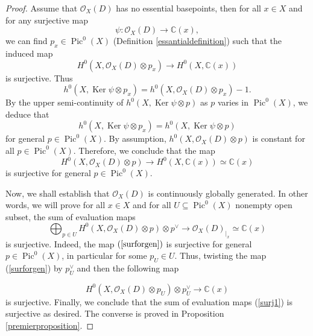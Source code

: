 \documentclass[sn-mathphys-num]{sn-jnl}%
\newcommand{\C}{\mathbb{C}}
\theoremstyle{definition}
\numberwithin{equation}{section}
\begin{document}
\begin{proof}
    Assume that $\mathcal{O}_{X}(D)$ has no essential basepoints, then for all $x \in X$ and for any surjective map 
    \[\psi: \mathcal{O}_{X}(D) \to \C(x),\] we can find $p_{x} \in \operatorname{Pic}^{0}(X)$ (Definition \ref{essantialdefinition}) such that the induced map \[H^{0}(X, \mathcal{O}_{X}(D) \otimes p_{x} ) \to H^{0}(X, \C(x))\] 
    is surjective. Thus $$h^{0}(X, \operatorname{Ker}\psi \otimes p_x) = h^{0}(X, \mathcal{O}_{X}(D) \otimes p_{x} ) -1.$$  
    By the upper semi-continuity of $h^{0}(X, \operatorname{Ker}\psi \otimes p)$ as $p$ varies in $\operatorname{Pic}^{0}(X)$, we deduce that 
    \[
    h^{0}(X, \operatorname{Ker}\psi \otimes p_x) = h^{0}(X, \operatorname{Ker}\psi \otimes p)
    \]
    for general $p \in \operatorname{Pic}^{0}(X)$. By assumption, $h^{0}(X, \mathcal{O}_{X}(D) \otimes p)$ is constant for all $p \in \operatorname{Pic}^{0}(X)$. Therefore,  we conclude that the map 
   \begin{equation}\label{surforgen}
       H^{0}(X, \mathcal{O}_{X}(D) \otimes p) \to H^{0}(X, \C(x)) \simeq \C(x)
       \end{equation}
   is surjective for general $p \in \operatorname{Pic}^{0}(X)$. 
   \par Now, we shall establish that $\mathcal{O}_{X}(D)$ is continuously globally generated. In other words, we will prove for all $x \in X$ and for all $U \subseteq \operatorname{Pic}^{0}(X)$ nonempty open subset, the sum of evaluation maps 
\begin{equation}\label{surj1}
\bigoplus_{p \in U} H^{0}(X,\mathcal{O}_{X}(D) \otimes p) \otimes p^{\vee} \to \mathcal{O}_{X}(D)_{|_{x}} \simeq \C(x)
\end{equation}
is surjective. Indeed, the map $(\ref{surforgen})$  is surjective for general $p \in \operatorname{Pic}^{0}(X)$, in particular for some $p_{U} \in U$. Thus, twisting the map (\ref{surforgen}) by $p_{U}^{\vee}$ and then the following map 

\[H^{0}(X, \mathcal{O}_{X}(D) \otimes p_{U}) \otimes p_{U}^{\vee} \to \C(x)
\]
is surjective. Finally, we conclude that the sum of
evaluation maps (\ref{surj1}) is surjective as desired. The converse is proved in Proposition \ref{premierproposition}.
\end{proof}
\end{document}
